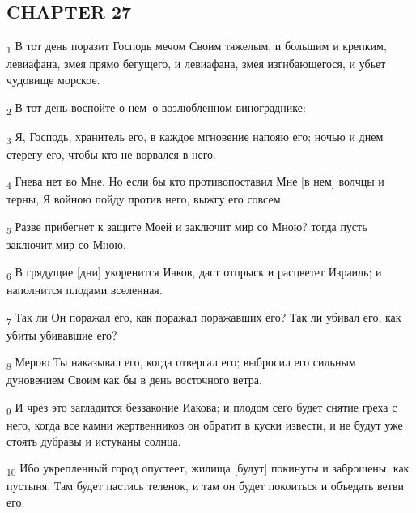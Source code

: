 \subsection{CHAPTER 27}
\begin{tcolorbox}
\textsubscript{1} В тот день поразит Господь мечом Своим тяжелым, и большим и крепким, левиафана, змея прямо бегущего, и левиафана, змея изгибающегося, и убьет чудовище морское.
\end{tcolorbox}
\begin{tcolorbox}
\textsubscript{2} В тот день воспойте о нем--о возлюбленном винограднике:
\end{tcolorbox}
\begin{tcolorbox}
\textsubscript{3} Я, Господь, хранитель его, в каждое мгновение напояю его; ночью и днем стерегу его, чтобы кто не ворвался в него.
\end{tcolorbox}
\begin{tcolorbox}
\textsubscript{4} Гнева нет во Мне. Но если бы кто противопоставил Мне [в нем] волчцы и терны, Я войною пойду против него, выжгу его совсем.
\end{tcolorbox}
\begin{tcolorbox}
\textsubscript{5} Разве прибегнет к защите Моей и заключит мир со Мною? тогда пусть заключит мир со Мною.
\end{tcolorbox}
\begin{tcolorbox}
\textsubscript{6} В грядущие [дни] укоренится Иаков, даст отпрыск и расцветет Израиль; и наполнится плодами вселенная.
\end{tcolorbox}
\begin{tcolorbox}
\textsubscript{7} Так ли Он поражал его, как поражал поражавших его? Так ли убивал его, как убиты убивавшие его?
\end{tcolorbox}
\begin{tcolorbox}
\textsubscript{8} Мерою Ты наказывал его, когда отвергал его; выбросил его сильным дуновением Своим как бы в день восточного ветра.
\end{tcolorbox}
\begin{tcolorbox}
\textsubscript{9} И чрез это загладится беззаконие Иакова; и плодом сего будет снятие греха с него, когда все камни жертвенников он обратит в куски извести, и не будут уже стоять дубравы и истуканы солнца.
\end{tcolorbox}
\begin{tcolorbox}
\textsubscript{10} Ибо укрепленный город опустеет, жилища [будут] покинуты и заброшены, как пустыня. Там будет пастись теленок, и там он будет покоиться и объедать ветви его.
\end{tcolorbox}
